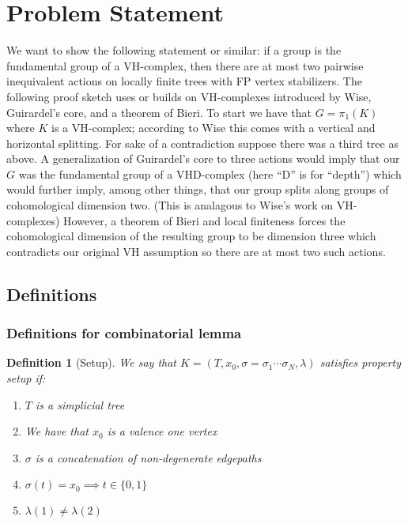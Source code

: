 \documentclass{article}
\theoremstyle{mystyle}
\newtheorem{defn}{Definition}
\theoremstyle{remark}
\begin{document}
\section{Problem Statement}
We want to show the following statement or similar: if a group is the fundamental group of a VH-complex, then there are at most two pairwise inequivalent actions on locally finite trees with FP vertex stabilizers. The following proof sketch uses or builds on VH-complexes introduced by Wise, Guirardel's core, and a theorem of Bieri. To start we have that \(G = \pi_1(K)\) where \(K\) is a VH-complex; according to Wise this comes with a vertical and horizontal splitting. For sake of a contradiction suppose there was a third tree as above. A generalization of Guirardel's core to three actions would imply that our \(G\) was the fundamental group of a VHD-complex (here ``D'' is for ``depth'') which would further imply, among other things, that our group splits along groups of cohomological dimension two. (This is analagous to Wise's work on VH-complexes) However, a theorem of Bieri and local finiteness forces the cohomological dimension of the resulting group to be dimension three which contradicts our original VH assumption so there are at most two such actions.

\subsection{Definitions}

\subsubsection{Definitions for combinatorial lemma}
\begin{defn}
    [Setup]
    \label{def:setup} 
    We say that \(K = (T, x_{0},\sigma=\sigma_{1}\cdots\sigma_{N},\lambda)\) satisfies property {\em setup} if:
    \begin{enumerate}
        \item \(T\) is a simplicial tree
        \item We have that \(x_{0}\) is a valence one vertex
        \item \(\sigma\) is a concatenation of non-degenerate edgepaths
        \item \(\sigma (t)=x_{0} \implies t \in \{0,1\}\) 
        \item \(\lambda (1) \neq \lambda (2)\) 
    \end{enumerate}
\end{defn}
\end{document}
